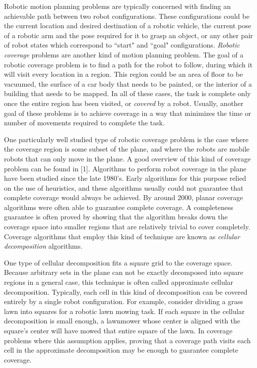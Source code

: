 \documentclass[letterpaper, 12pt, leqno]{report}
\begin{document}
Robotic motion planning problems are typically concerned with finding an achievable path between two robot configurations. These configurations could be the current location and desired destination of a robotic vehicle, the current pose of a robotic arm and the pose required for it to grasp an object, or any other pair of robot states which correspond to ``start" and ``goal" configurations. \textit{Robotic coverage} problems are another kind of motion planning problem. The goal of a robotic coverage problem is to find a path for the robot to follow, during which it will visit every location in a region. This region could be an area of floor to be vacuumed, the surface of a car body that needs to be painted, or the interior of a building that needs to be mapped. In all of these cases, the task is complete only once the entire region has been visited, or \textit{covered} by a robot. Usually, another goal of these problems is to achieve coverage in a way that minimizes the time or number of movements required to complete the task.

One particularly well studied type of robotic coverage problem is the case where the coverage region is some subset of the plane, and where the robots are mobile robots that can only move in the plane. A good overview of this kind of coverage problem can be found in [1]. Algorithms to perform robot coverage in the plane have been studied since the late 1980's. Early algorithms for this purpose relied on the use of heuristics, and these algorithms usually could not guarantee that complete coverage would always be achieved. By around 2000, planar coverage algorithms were often able to guarantee complete coverage. A completeness guarantee is often proved by showing that the algorithm breaks down the coverage space into smaller regions that are relatively trivial to cover completely. Coverage algorithms that employ this kind of technique are known as \textit{cellular decomposition} algorithms.

One type of cellular decomposition fits a square grid to the coverage space. Because arbitrary sets in the plane can not be exactly decomposed into square regions in a general case, this technique is often called approximate cellular decomposition. Typically, each cell in this kind of decomposition can be covered entirely by a single robot configuration. For example, consider dividing a grass lawn into squares for a robotic lawn mowing task. If each square in the cellular decomposition is small enough, a lawnmower whose center is aligned with the square's center will have mowed that entire square of the lawn. In coverage problems where this assumption applies, proving that a coverage path visits each cell in the approximate decomposition may be enough to guarantee complete coverage.
\end{document}
